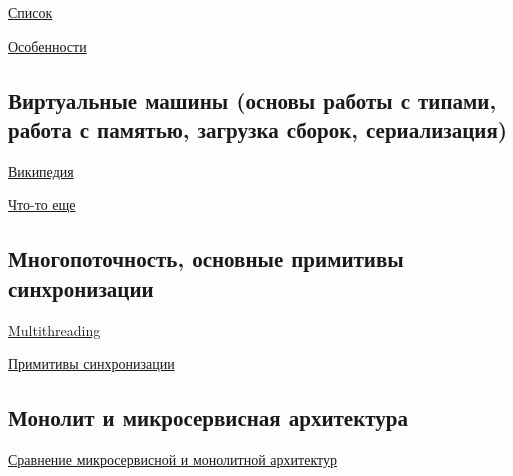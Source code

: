 \documentclass{article}
\begin{document}
\href{https://ru.wikipedia.org/wiki/%D0%9E%D0%B1%D1%8A%D0%B5%D0%BA%D1%82%D0%BD%D0%BE-%D0%BE%D1%80%D0%B8%D0%B5%D0%BD%D1%82%D0%B8%D1%80%D0%BE%D0%B2%D0%B0%D0%BD%D0%BD%D1%8B%D0%B9_%D1%8F%D0%B7%D1%8B%D0%BA_%D0%BF%D1%80%D0%BE%D0%B3%D1%80%D0%B0%D0%BC%D0%BC%D0%B8%D1%80%D0%BE%D0%B2%D0%B0%D0%BD%D0%B8%D1%8F}{Список}

\href{https://tproger.ru/translations/sovremennye-jazyki-programmirovanija-kotorye-zastavjat-vas-stradat-chast-1-oop/}{Особенности}

\subsection{ Виртуальные машины (основы работы с типами, работа с памятью, загрузка сборок, сериализация)}

\href{https://ru.wikipedia.org/wiki/%D0%92%D0%B8%D1%80%D1%82%D1%83%D0%B0%D0%BB%D1%8C%D0%BD%D0%B0%D1%8F_%D0%BC%D0%B0%D1%88%D0%B8%D0%BD%D0%B0}{Википедия}

\href{https://azure.microsoft.com/ru-ru/resources/cloud-computing-dictionary/what-is-a-virtual-machine/#overview}{Что-то еще}


\subsection{Многопоточность, основные примитивы синхронизации}

\href{https://habr.com/ru/company/otus/blog/549814/}{Multithreading}

\href{https://sites.google.com/site/interviewknowages/primitivy-sinhronizacii}{Примитивы синхронизации}

\subsection{Монолит и микросервисная архитектура}

\href{https://www.atlassian.com/ru/microservices/microservices-architecture/microservices-vs-monolith#:~:text=%D0%9C%D0%BE%D0%BD%D0%BE%D0%BB%D0%B8%D1%82%D0%BD%D0%BE%D0%B5%20%D0%BF%D1%80%D0%B8%D0%BB%D0%BE%D0%B6%D0%B5%D0%BD%D0%B8%D0%B5%20%E2%80%94%20%D1%8D%D1%82%D0%BE%20%D0%B5%D0%B4%D0%B8%D0%BD%D1%8B%D0%B9%20%D0%BE%D0%B1%D1%89%D0%B8%D0%B9,%D0%BD%D0%B0%D0%B1%D0%BE%D1%80%20%D0%BD%D0%B5%D0%B1%D0%BE%D0%BB%D1%8C%D1%88%D0%B8%D1%85%20%D0%BD%D0%B5%D0%B7%D0%B0%D0%B2%D0%B8%D1%81%D0%B8%D0%BC%D0%BE%20%D1%80%D0%B0%D0%B7%D0%B2%D0%B5%D1%80%D1%82%D1%8B%D0%B2%D0%B0%D0%B5%D0%BC%D1%8B%D1%85%20%D1%81%D0%BB%D1%83%D0%B6%D0%B1.}{Сравнение микросервисной и монолитной архитектур}
\end{document}
